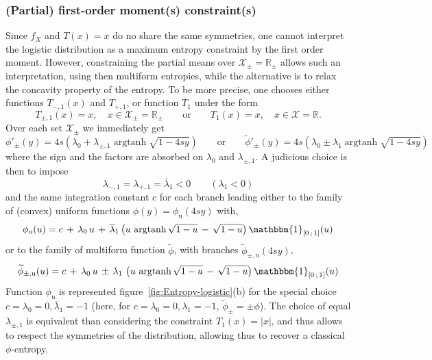 \documentclass[english,sort&compress]{elsarticle}
\theoremstyle{definition}
\theoremstyle{plain}
\theoremstyle{plain}
\def\Rset{\mathbb{R}}
\def\X{\mathcal{X}}
\def\un{\mathbbm{1}}
\def\argtanh{\operatorname{argtanh}}
\begin{document}
\subsubsection{(Partial) first-order moment(s) constraint(s)}

Since $f_X$ and $T(x) = x$ do no share the same symmetries, one cannot interpret
the logistic  distribution as  a maximum entropy  constraint by the  first order
moment. However,  constraining the partial  means over $\X_\pm  = \Rset_\pm$
allows  such  an  interpretation,  using  then multiform  entropies,  while  the
alternative  is to  relax the  concavity  property of  the entropy.  To be  more
precise, one  chooses either functions $T_{-,1}(x)$ and  $T_{+,1}$, or function
$T_1$ under the form
%
\[
T_{\pm,1}(x) = x, \quad x \in  \X_\pm = \Rset_\pm \qquad \mbox{or} \qquad T_1(x)
= x,\quad x \in \X = \Rset.
\]
%
Over each set $\X_\pm$ we immediately get 
%
\[
\phi'_\pm(y)  = 4  s \left(  \lambda_0 +  \lambda_{\pm,1} \argtanh\sqrt{1-4sy}
\right)  \qquad  \mbox{or}  \qquad   \widetilde{\phi}'_\pm(y)  =  4  s  \left(
  \lambda_0 \pm \lambda_1 \argtanh\sqrt{1-4sy} \right)
\]
%
where   the   sign  and   the   factors   are   absorbed  on   $\lambda_0$   and
$\lambda_{\pm,1}$. A judicious choice is then to impose
%
\[
\lambda_{-,1} = \lambda_{+,1} = \overline{\lambda}_1 < 0 \qquad (\lambda_1 < 0)
\]
%
and the  same integration constant  $c$ for each  branch leading either  to the
family of (convex) uniform functions $\phi(y) = \phi_{\mathrm{u}}(4 s y)$ with,
%
\[
\phi_{\mathrm{u}}(u) =  c \, +  \, \lambda_0 \,  u \, +  \, \overline{\lambda}_1
\left( u \, \argtanh\sqrt{1-u} \, -  \, \sqrt{1-u} \right) \un_{\left[ 0 \, ; \,
    1 \right]}(u)
\]
%
or  to  the  family  of  multiform function  $\widetilde{\phi}$,  with  branches
$\widetilde{\phi}_{\pm,\mathrm{u}}(4 s y)$,
%
\[
\widetilde{\phi}_{\pm,\mathrm{u}}(u)  = c  \,  + \,  \lambda_0  \, u  \, \pm  \,
\lambda_1  \,  \left(  u  \,  \argtanh\sqrt{1-u}  \,  -  \,  \sqrt{1-u}  \right)
\un_{\left[ 0 \, ; \, 1 \right]}(u)
\]
%
Function $\phi_{\mathrm{u}}$ is represented figure~\ref{fig:Entropy-logistic}(b)
for the special choice $c = \lambda_0 = 0, \overline{\lambda}_1 = -1$ (here, for
$c =  \lambda_0 = 0, \lambda_1  = -1$, $\widetilde{\phi}_\pm =  \pm \phi$).  The
choice of equal $\lambda_{\pm,1}$  is equivalent than considering the constraint
$T_1(x) = |x|$,  and thus allows to respect the  symmetries of the distribution,
allowing thus to recover a classical $\phi$-entropy.

\
\end{document}
